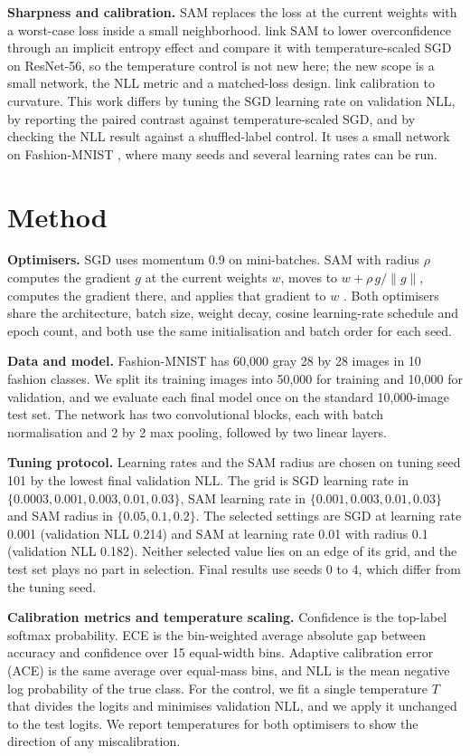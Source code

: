 \documentclass[11pt,letterpaper]{article}
\begin{document}
\textbf{Sharpness and calibration.} SAM \citep{Foret2020} replaces the loss at the current weights with a worst-case loss inside a small neighborhood. \citet{Tan2026} link SAM to lower overconfidence through an implicit entropy effect and compare it with temperature-scaled SGD on ResNet-56, so the temperature control is not new here; the new scope is a small network, the NLL metric and a matched-loss design. \citet{Morosini2026} link calibration to curvature. This work differs by tuning the SGD learning rate on validation NLL, by reporting the paired contrast against temperature-scaled SGD, and by checking the NLL result against a shuffled-label control. It uses a small network on Fashion-MNIST \citep{Xiao2017}, where many seeds and several learning rates can be run.

\section{Method}\label{sec:method}
\textbf{Optimisers.} SGD uses momentum 0.9 on mini-batches. SAM with radius $\rho$ computes the gradient $g$ at the current weights $w$, moves to $w + \rho\, g/\lVert g\rVert$, computes the gradient there, and applies that gradient to $w$ \citep{Foret2020}. Both optimisers share the architecture, batch size, weight decay, cosine learning-rate schedule and epoch count, and both use the same initialisation and batch order for each seed.

\textbf{Data and model.} Fashion-MNIST \citep{Xiao2017} has 60,000 gray 28 by 28 images in 10 fashion classes. We split its training images into 50,000 for training and 10,000 for validation, and we evaluate each final model once on the standard 10,000-image test set. The network has two convolutional blocks, each with batch normalisation and 2 by 2 max pooling, followed by two linear layers.

\textbf{Tuning protocol.} Learning rates and the SAM radius are chosen on tuning seed 101 by the lowest final validation NLL. The grid is SGD learning rate in $\{0.0003, 0.001, 0.003, 0.01, 0.03\}$, SAM learning rate in $\{0.001, 0.003, 0.01, 0.03\}$ and SAM radius in $\{0.05, 0.1, 0.2\}$. The selected settings are SGD at learning rate 0.001 (validation NLL 0.214) and SAM at learning rate 0.01 with radius 0.1 (validation NLL 0.182). Neither selected value lies on an edge of its grid, and the test set plays no part in selection. Final results use seeds 0 to 4, which differ from the tuning seed.

\textbf{Calibration metrics and temperature scaling.} Confidence is the top-label softmax probability. ECE is the bin-weighted average absolute gap between accuracy and confidence over 15 equal-width bins. Adaptive calibration error (ACE) is the same average over equal-mass bins, and NLL is the mean negative log probability of the true class. For the control, we fit a single temperature $T$ that divides the logits and minimises validation NLL, and we apply it unchanged to the test logits. We report temperatures for both optimisers to show the direction of any miscalibration.
\end{document}
